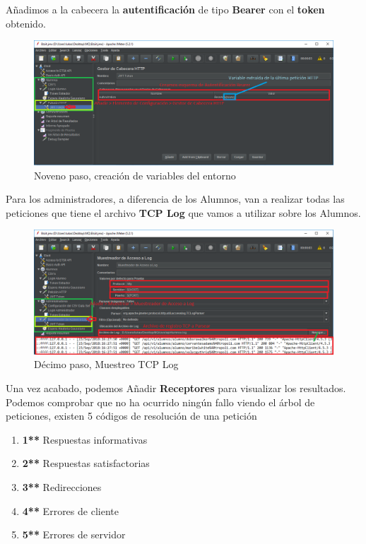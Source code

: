 \documentclass[12pt,a4paper]{article}
\begin{document}
	\newpage

	Añadimos a la cabecera la \textbf{autentificación} de tipo \textbf{Bearer} con el \textbf{token} obtenido.

	\begin{figure}[h]
		\centering
		\includegraphics[width=1.0\textwidth]{images/step-9.png}
		\caption{Noveno paso, creación de variables del entorno}
	\end{figure}

	Para los administradores, a diferencia de los Alumnos, van a realizar todas las peticiones que tiene el archivo \textbf{TCP Log} que vamos a utilizar sobre los Alumnos.
	

	\begin{figure}[h]
		\centering
		\includegraphics[width=1.0\textwidth]{images/step-10.png}
		\caption{Décimo paso, Muestreo TCP Log}
	\end{figure}
	\newpage
	Una vez acabado, podemos Añadir \textbf{Receptores} para visualizar los resultados.
	Podemos comprobar que no ha ocurrido ningún fallo viendo el árbol de peticiones, existen 5 códigos de resolución de una petición
	\begin{enumerate}
		\item {\color{info}\textbf{1**}} Respuestas informativas
		\item {\color{ok}\textbf{2**}} Respuestas satisfactorias
		\item {\color{redirection}\textbf{3**}} Redirecciones
		\item {\color{bad}\textbf{4**}} Errores de cliente
		\item {\color{bad}\textbf{5**}} Errores de servidor
	\end{enumerate}
	
\end{document}
